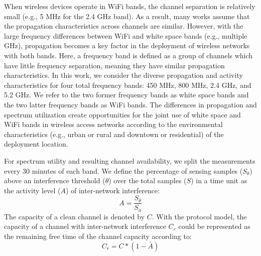 When wireless devices operate in WiFi bands, the channel separation is relatively 
small (e.g., 5 MHz for the 2.4 GHz band). As a result, many works assume that
the propagation characteristics across channels are similar. However, with the
large frequency differences between WiFi and white space bands (e.g., multiple GHz),
propagation becomes a key factor in the deployment of wireless networks with both bands.
Here, a frequency band is defined as a group of channels which have
little frequency separation, meaning they have similar propagation characteristics.
In this work, we consider the diverse propagation and activity characteristics
for four total frequency bands: 450 MHz, 800 MHz, 2.4 GHz, and 5.2 GHz.
We refer to the two former frequency bands as white space bands and
the two latter frequency bands as WiFi bands.
The differences in propagation and spectrum utilization create opportunities
for the joint use of white space and WiFi bands in wireless access networks according
to the environmental characteristics (e.g., urban or rural and downtown or residential)
of the deployment location.


For spectrum utility and resulting channel availability, 
we split the measurements every 30 minutes of each band.  We define the percentage of sensing 
samples ($S_\theta$) above an interference threshold ($\theta$) over the total samples ($S$) in 
a time unit as the activity level ($A$) of inter-network interference:
\begin{equation}
\label{eq:actdef}
A=\frac{S_\theta}{S_a}
\end{equation}
The capacity of a clean channel is denoted by $C$. With the protocol model, the capacity 
of a channel with inter-network interference $C_r$ could be represented as 
the remaining free time of the channel capacity according to: 
\begin{equation}
\label{eq:intercap}
C_r=C*(1-\bar{A})
\end{equation}




